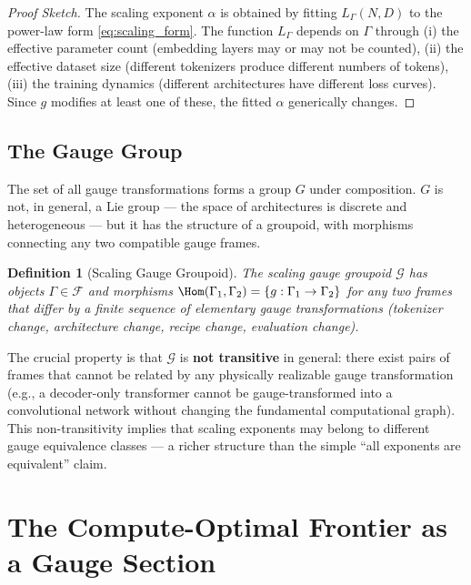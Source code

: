 \documentclass[12pt,a4paper]{article}
\newtheorem{definition}[theorem]{Definition}
\theoremstyle{remark}
\newcommand{\Loss}{L}
\begin{document}
\begin{proof}[Proof Sketch]
The scaling exponent $\alpha$ is obtained by fitting $\Loss_\Gamma(N, D)$ to the power-law form \eqref{eq:scaling_form}. The function $\Loss_\Gamma$ depends on $\Gamma$ through (i) the effective parameter count (embedding layers may or may not be counted), (ii) the effective dataset size (different tokenizers produce different numbers of tokens), (iii) the training dynamics (different architectures have different loss curves). Since $g$ modifies at least one of these, the fitted $\alpha$ generically changes.
\end{proof}

\subsection{The Gauge Group}

The set of all gauge transformations forms a group $G$ under composition. $G$ is not, in general, a Lie group — the space of architectures is discrete and heterogeneous — but it has the structure of a groupoid, with morphisms connecting any two compatible gauge frames.

\begin{definition}[Scaling Gauge Groupoid]
\label{def:groupoid}
The scaling gauge groupoid $\mathcal{G}$ has objects $\Gamma \in \mathcal{F}$ and morphisms $\Hom(\Gamma_1, \Gamma_2) = \{g: \Gamma_1 \to \Gamma_2\}$ for any two frames that differ by a finite sequence of elementary gauge transformations (tokenizer change, architecture change, recipe change, evaluation change).
\end{definition}

The crucial property is that $\mathcal{G}$ is \textbf{not transitive} in general: there exist pairs of frames that cannot be related by any physically realizable gauge transformation (e.g., a decoder-only transformer cannot be gauge-transformed into a convolutional network without changing the fundamental computational graph). This non-transitivity implies that scaling exponents may belong to different gauge equivalence classes — a richer structure than the simple ``all exponents are equivalent'' claim.

\section{The Compute-Optimal Frontier as a Gauge Section}
\label{sec:frontier}
\end{document}
